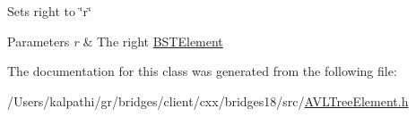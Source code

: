 Sets right to \char`\"{}r\char`\"{}


\begin{DoxyParams}{Parameters}
{\em r} & The right \mbox{\hyperlink{classbridges_1_1_b_s_t_element}{B\+S\+T\+Element}} \\
\hline
\end{DoxyParams}


The documentation for this class was generated from the following file\+:\begin{DoxyCompactItemize}
\item 
/\+Users/kalpathi/gr/bridges/client/cxx/bridges18/src/\mbox{\hyperlink{_a_v_l_tree_element_8h}{A\+V\+L\+Tree\+Element.\+h}}\end{DoxyCompactItemize}
